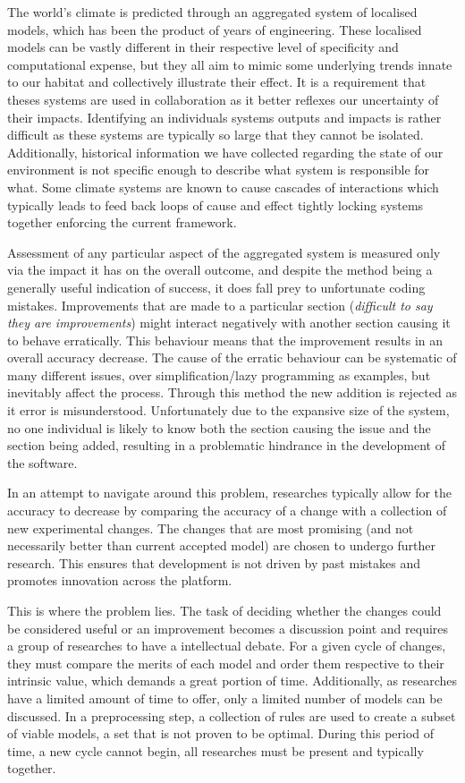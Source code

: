 \documentclass{ecmm427_assignment}
\begin{document}
\noindent The world's climate is predicted through an aggregated system of localised models, which has been the product of years of engineering. These localised models can be vastly different in their respective level of specificity and computational expense, but they all aim to mimic some underlying trends innate to our habitat and collectively illustrate their effect. It is a requirement that theses systems are used in collaboration as it better reflexes our uncertainty of their impacts. Identifying an individuals systems outputs and impacts is rather difficult as these systems are typically so large that they cannot be isolated. Additionally, historical information we have collected regarding the state of our environment is not specific enough to describe what system is responsible for what. Some climate systems are known to cause cascades of interactions which typically leads to feed back loops of cause and effect tightly locking systems together enforcing the current framework.

Assessment of any particular aspect of the aggregated system is measured only via the impact it has on the overall outcome, and despite the method being a generally useful indication of success, it does fall prey to unfortunate coding mistakes. Improvements that are made to a particular section (\textit{difficult to say they are improvements}) might interact negatively with another section causing it to behave erratically. This behaviour means that the improvement results in an overall accuracy decrease. The cause of the erratic behaviour can be systematic of many different issues, over simplification/lazy programming as examples, but inevitably affect the process. Through this method the new addition is rejected as it error is misunderstood. Unfortunately due to the expansive size of the system, no one individual is likely to know both the section causing the issue and the section being added, resulting in a problematic hindrance in the development of the software.

In an attempt to navigate around this problem, researches typically allow for the accuracy to decrease by comparing the accuracy of a change with a collection of new experimental changes. The changes that are most promising (and not necessarily better than current accepted model) are chosen to undergo further research. This ensures that development is not driven by past mistakes and promotes innovation across the platform.

This is where the problem lies. The task of deciding whether the changes could be considered useful or an improvement becomes a discussion point and requires a group of researches to have a intellectual debate. For a given cycle of changes, they must compare the merits of each model and order them respective to their intrinsic value, which demands a great portion of time. Additionally, as researches have a limited amount of time to offer, only a limited number of models can be discussed. In a preprocessing step, a collection of rules are used to create a subset of viable models, a set that is not proven to be optimal. During this period of time, a new cycle cannot begin, all researches must be present and typically together.
\end{document}
